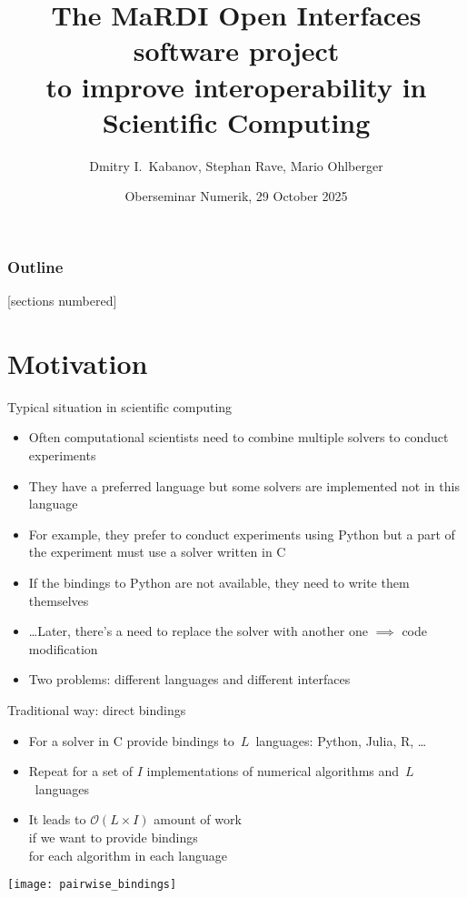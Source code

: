 \documentclass[
  10pt,
  aspectratio=169,
  english,
]{beamer}
\title{%
  The MaRDI Open Interfaces software project\\to improve interoperability in
  Scientific Computing}
\author{Dmitry I.\ Kabanov, Stephan Rave, Mario Ohlberger}
\institute{Mathematics Münster, University of Münster, Germany}
\date{Oberseminar Numerik, 29 October 2025}
\begin{document}
\maketitle

\begin{frame}
  \frametitle{Outline}
  [sections numbered]
  \tableofcontents
\end{frame}

\section{Motivation}

\begin{frame}{Typical situation in scientific computing}
  \begin{itemize}
    \item Often computational scientists need
          to combine multiple solvers to conduct experiments
    \item They have a preferred language but some solvers are implemented
          not in this language
    \item For example, they prefer to conduct experiments using Python
          but a part of the experiment must use a solver written in C
    \item If the bindings to Python are not available, they need to write
          them themselves
    \item \dots Later, there's a need to replace the solver with
          another one $\implies$ code modification
    \item<2-> \alert{Two problems:} different languages and different interfaces
  \end{itemize}
\end{frame}

\begin{frame}{Traditional way: direct bindings}
  \begin{minipage}{0.45\textwidth}
    \begin{itemize}
      \item For a solver in C provide bindings to~$L$~languages: Python, Julia, R, \dots
      \item Repeat for a set of $I$ implementations of numerical algorithms
            and~$L$~languages
      \item It leads to $\mathcal O(L \times I)$ amount of work\\
      if we want to provide bindings\\
      for each algorithm in each language
    \end{itemize}
  \end{minipage}\hfill
  \begin{minipage}{0.45\textwidth}
    \centering
    \texttt{[image: pairwise\_bindings]}
  \end{minipage}
\end{frame}
\end{document}
